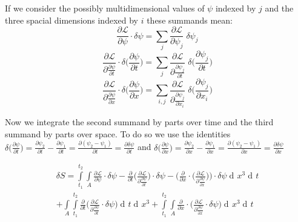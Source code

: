 \documentclass{article}
\DeclareMathOperator{\dd}{d\!}
\begin{document}
If we consider the possibly multidimensional values of $\psi$ indexed by $j$ and the three spacial dimensions indexed by $i$ these summands mean:
\begin{equation}
\frac{\partial \mathcal{L}}{\partial \psi} \cdot \delta \psi 
= \sum_{j} \frac{\partial \mathcal{L}}{\partial \psi_{j}} \; \delta \psi_{j} 
\end{equation}
\begin{equation}
\frac{\partial \mathcal{L}}{\partial \frac{\partial \psi}{\partial t}} \cdot \delta \bigg(\frac{\partial \psi} {\partial t}\bigg)
= \sum_{j} \frac{\partial \mathcal{L}}{\partial \frac{\partial \psi_{j}}{\partial t}} \; \delta \bigg(\frac{\partial \psi_{j}} {\partial t}\bigg)
\end{equation}
\begin{equation}
\frac{\partial \mathcal{L}}{\partial \frac{\partial \psi}{\partial x}} \cdot \delta \bigg(\frac{\partial \psi} {\partial x}\bigg)
= \sum_{i,j} \frac{\partial \mathcal{L}}{\partial \frac{\partial \psi_{j}}{\partial x_{i}}} \; \delta \bigg(\frac{\partial \psi_{j}} {\partial x_{i}}\bigg)
\end{equation}

Now we integrate the second summand by parts over time and the third summand by parts over space. To do so we use the identities 
$\delta \bigg(\frac{\partial \psi} {\partial t}\bigg) 
= \frac{\partial \psi_2} {\partial t} - \frac{\partial \psi_1} {\partial t}
= \frac{\partial (\psi_2 - \psi_1)} {\partial t}
= \frac{\partial \delta \psi} {\partial t}$ 
and
$\delta \bigg(\frac{\partial \psi} {\partial x}\bigg) 
= \frac{\partial \psi_2} {\partial x} - \frac{\partial \psi_1} {\partial x}
= \frac{\partial (\psi_2 - \psi_1)} {\partial x}
= \frac{\partial \delta \psi} {\partial x}$ 

\begin{equation} \label{calcDeltaSSection2}
\begin{split}
\delta S = \int\limits_{t_1}^{t_2} \int\limits_{A} 
\frac{\partial \mathcal{L}}{\partial \psi} \cdot \delta \psi
-\frac{\partial}{\partial t} \bigg( \frac{\partial \mathcal{L}}{\partial \frac{\partial \psi}{\partial t}} \bigg) \cdot \delta \psi
-\bigg(\frac{\partial}{\partial x} \cdot \bigg( \frac{\partial \mathcal{L}}{\partial \frac{\partial \psi}{\partial x}} \bigg)\bigg) \cdot \delta \psi
\dd x^3 \dd t \\
+ \int\limits_{A} \int\limits_{t_1}^{t_2} \frac{\partial}{\partial t} \bigg(\frac{\partial \mathcal{L}}{\partial \frac{\partial \psi}{\partial t}} \cdot \delta \psi \bigg) \dd t \dd x^3
+ \int\limits_{t_1}^{t_2} 
\int\limits_{A} \frac{\partial}{\partial x} \cdot \bigg( \frac{\partial \mathcal{L}}{\partial \frac{\partial \psi}{\partial x}} \cdot \delta \psi \bigg) \dd x^3  \dd t
\end{split}
\end{equation}
\end{document}
